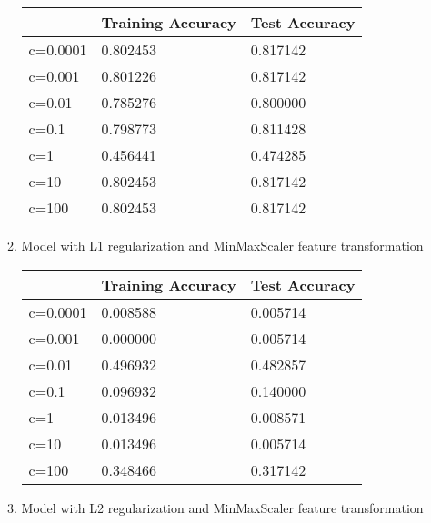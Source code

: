 \documentclass[12pt]{article}
\begin{document}
\begin{enumerate}
\begin{enumerate}
		\begin{center}
			\begin{tabular}{|l|l|l|}
				\hline
				& Training Accuracy & Test Accuracy \\ \hline
				c=0.0001 & 0.802453           & 0.817142       \\ \hline
				c=0.001  & 0.801226           & 0.817142       \\ \hline
				c=0.01   & 0.785276           & 0.800000       \\ \hline
				c=0.1    & 0.798773           & 0.811428       \\ \hline
				c=1      & 0.456441           & 0.474285       \\ \hline
				c=10     & 0.802453           & 0.817142       \\ \hline
				c=100    & 0.802453           & 0.817142       \\ \hline
			\end{tabular}
		\end{center}
		
		\item Model with L1 regularization and MinMaxScaler feature transformation
		
		\begin{center}
			\begin{tabular}{|l|l|l|}
				\hline
				& Training Accuracy & Test Accuracy \\ \hline
				c=0.0001 & 0.008588            & 0.005714        \\ \hline
				c=0.001  & 0.000000            & 0.005714        \\ \hline
				c=0.01   & 0.496932           & 0.482857       \\ \hline
				c=0.1    & 0.096932            & 0.140000       \\ \hline
				c=1      & 0.013496            & 0.008571        \\ \hline
				c=10     & 0.013496            & 0.005714        \\ \hline
				c=100    & 0.348466           & 0.317142       \\ \hline
			\end{tabular}
		\end{center}
		
		\item Model with L2 regularization and MinMaxScaler feature transformation
		

\end{enumerate}
\end{enumerate}
\end{document}
